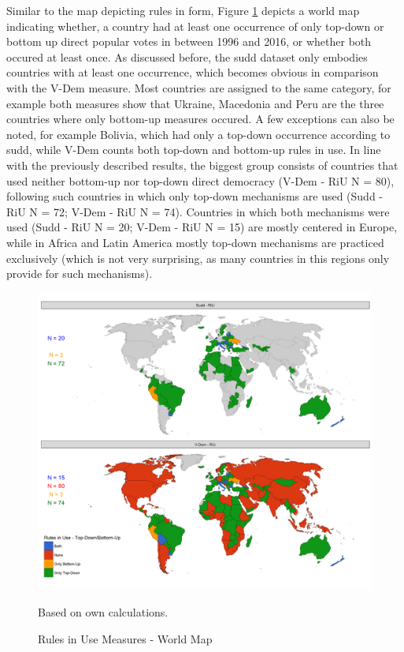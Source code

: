 \documentclass[]{article}
\begin{document}
Similar to the map depicting rules in form, Figure \ref{map_riu} depicts
a world map indicating whether, a country had at least one occurrence of
only top-down or bottom up direct popular votes in between 1996 and
2016, or whether both occured at least once. As discussed before, the
sudd dataset only embodies countries with at least one occurrence, which
becomes obvious in comparison with the V-Dem measure. Most countries are
assigned to the same category, for example both measures show that
Ukraine, Macedonia and Peru are the three countries where only bottom-up
measures occured. A few exceptions can also be noted, for example
Bolivia, which had only a top-down occurrence according to sudd, while
V-Dem counts both top-down and bottom-up rules in use. In line with the
previously described results, the biggest group consists of countries
that used neither bottom-up nor top-down direct democracy (V-Dem - RiU N
= 80), following such countries in which only top-down mechanisms are
used (Sudd - RiU N = 72; V-Dem - RiU N = 74). Countries in which both
mechanisms were used (Sudd - RiU N = 20; V-Dem - RiU N = 15) are mostly
centered in Europe, while in Africa and Latin America mostly top-down
mechanisms are practiced exclusively (which is not very surprising, as
many countries in this regions only provide for such mechanisms).

\begin{figure}[!th]
    \caption{Rules in Use Measures - World Map}
    \label{map_riu}
    \includegraphics[width=\textwidth]{images/map_riu.png}
    \flushright
    {\scriptsize Based on own calculations. \par}
\end{figure}
\end{document}
